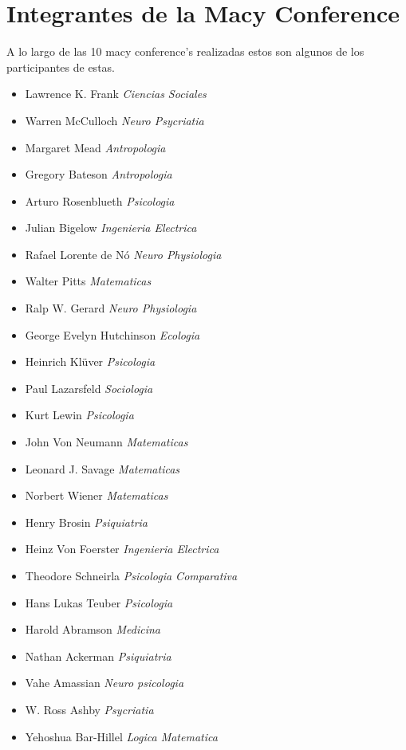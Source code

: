 \documentclass[a4paper,12pt]{article}
\begin{document}
\section{Integrantes de la Macy Conference}
A lo largo de las 10 macy conference's realizadas estos son algunos de los participantes de estas.
\begin{itemize}
  \item Lawrence K. Frank {\itshape Ciencias Sociales}
  \item Warren McCulloch {\itshape Neuro Psycriatia}
  \item Margaret Mead {\itshape Antropologia}
  \item Gregory Bateson {\itshape Antropologia}
  \item Arturo Rosenblueth {\itshape Psicologia}
  \item Julian Bigelow {\itshape Ingenieria Electrica}
  \item Rafael Lorente de N\'o {\itshape Neuro Physiologia}
  \item Walter Pitts {\itshape Matematicas}
  \item Ralp W. Gerard {\itshape Neuro Physiologia}
  \item George Evelyn Hutchinson {\itshape Ecologia}
  \item Heinrich Kl\"uver {\itshape Psicologia}
  \item Paul Lazarsfeld {\itshape Sociologia}
  \item Kurt Lewin {\itshape Psicologia}
  \item John Von Neumann {\itshape Matematicas}
  \item Leonard J. Savage {\itshape Matematicas}
  \item Norbert Wiener {\itshape Matematicas}
  \item	Henry Brosin {\itshape Psiquiatria}
  \item Heinz Von Foerster {\itshape Ingenieria Electrica}
  \item Theodore Schneirla {\itshape Psicologia Comparativa}
  \item Hans Lukas Teuber {\itshape Psicologia}
  \item Harold Abramson {\itshape Medicina} 
  \item Nathan Ackerman {\itshape Psiquiatria} 
  \item Vahe Amassian  {\itshape Neuro psicologia} 
  \item W. Ross Ashby {\itshape Psycriatia} 
  \item Yehoshua Bar-Hillel {\itshape Logica Matematica} 

\end{itemize}
\end{document}

